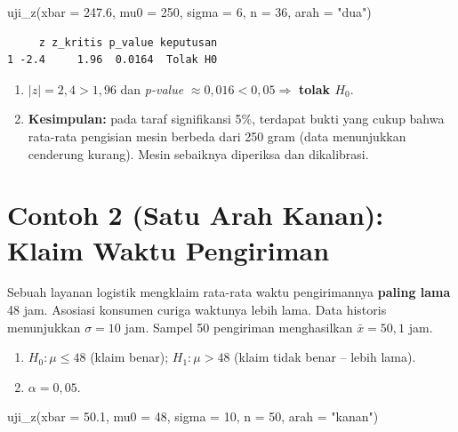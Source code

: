 \documentclass[
  indonesian,
  letterpaper,
]{book}
\newenvironment{Shaded}{\begin{snugshade}}{\end{snugshade}}
\newcommand{\AttributeTok}[1]{\textcolor[rgb]{0.40,0.45,0.13}{#1}}
\newcommand{\DecValTok}[1]{\textcolor[rgb]{0.68,0.00,0.00}{#1}}
\newcommand{\FloatTok}[1]{\textcolor[rgb]{0.68,0.00,0.00}{#1}}
\newcommand{\FunctionTok}[1]{\textcolor[rgb]{0.28,0.35,0.67}{#1}}
\newcommand{\NormalTok}[1]{\textcolor[rgb]{0.00,0.23,0.31}{#1}}
\newcommand{\StringTok}[1]{\textcolor[rgb]{0.13,0.47,0.30}{#1}}
\providecommand{\tightlist}{%
  \setlength{\itemsep}{0pt}\setlength{\parskip}{0pt}}
\begin{document}
\begin{Shaded}
\begin{Highlighting}[]
\FunctionTok{uji\_z}\NormalTok{(}\AttributeTok{xbar =} \FloatTok{247.6}\NormalTok{, }\AttributeTok{mu0 =} \DecValTok{250}\NormalTok{, }\AttributeTok{sigma =} \DecValTok{6}\NormalTok{, }\AttributeTok{n =} \DecValTok{36}\NormalTok{, }\AttributeTok{arah =} \StringTok{"dua"}\NormalTok{)}
\end{Highlighting}
\end{Shaded}

\begin{verbatim}
     z z_kritis p_value keputusan
1 -2.4     1.96  0.0164  Tolak H0
\end{verbatim}

\begin{enumerate}
\def\labelenumi{\arabic{enumi}.}
\setcounter{enumi}{3}
\tightlist
\item
  \(\lvert z \rvert = 2{,}4 > 1{,}96\) dan \emph{p-value}
  \(\approx 0{,}016 < 0{,}05 \Rightarrow\) \textbf{tolak \(H_0\)}.
\item
  \textbf{Kesimpulan:} pada taraf signifikansi 5\%, terdapat bukti yang
  cukup bahwa rata-rata pengisian mesin berbeda dari 250 gram (data
  menunjukkan cenderung kurang). Mesin sebaiknya diperiksa dan
  dikalibrasi.
\end{enumerate}

\section{Contoh 2 (Satu Arah Kanan): Klaim Waktu
Pengiriman}\label{contoh-2-satu-arah-kanan-klaim-waktu-pengiriman}

Sebuah layanan logistik mengklaim rata-rata waktu pengirimannya
\textbf{paling lama} 48 jam. Asosiasi konsumen curiga waktunya lebih
lama. Data historis menunjukkan \(\sigma = 10\) jam. Sampel 50
pengiriman menghasilkan \(\bar{x} = 50{,}1\) jam.

\begin{enumerate}
\def\labelenumi{\arabic{enumi}.}
\tightlist
\item
  \(H_0 : \mu \leq 48\) (klaim benar); \(H_1 : \mu > 48\) (klaim tidak
  benar -- lebih lama).
\item
  \(\alpha = 0{,}05\).
\end{enumerate}

\begin{Shaded}
\begin{Highlighting}[]
\FunctionTok{uji\_z}\NormalTok{(}\AttributeTok{xbar =} \FloatTok{50.1}\NormalTok{, }\AttributeTok{mu0 =} \DecValTok{48}\NormalTok{, }\AttributeTok{sigma =} \DecValTok{10}\NormalTok{, }\AttributeTok{n =} \DecValTok{50}\NormalTok{, }\AttributeTok{arah =} \StringTok{"kanan"}\NormalTok{)}
\end{Highlighting}
\end{Shaded}
\end{document}
